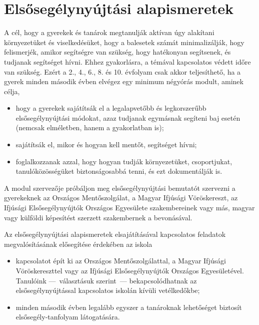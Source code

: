 \hypertarget{elsosegely-nyujtasi-alapismeretek}{%
\section{Elsősegélynyújtási
alapismeretek}\label{elsosegely-nyujtasi-alapismeretek}}

A cél, hogy a gyerekek és tanárok megtanulják aktívan úgy alakítani
környezetüket és viselkedésüket, hogy a balesetek számát minimalizálják,\break
hogy felismerjék, amikor segítségre van szükség, hogy hatékonyan
segítsenek, és tudjanak segítséget hívni. Ehhez gyakorlásra, a témával
kapcsolatos védett időre van szükség. Ezért a 2., 4., 6., 8. és
10. évfolyam csak akkor teljesíthető, ha a gyerek minden második évben
elvégez egy minimum négyórás modult, aminek célja,

\begin{itemize}
\tightlist
\item
  hogy a gyerekek sajátítsák el a legalapvetőbb és legkorszerűbb
  elsősegélynyújtási módokat, azaz tudjanak egymásnak segíteni
  baj esetén (nemcsak elméletben, hanem a gyakorlatban is);
\item
  sajátítsák el, mikor és hogyan kell mentőt, segítséget hívni;
\item
  foglalkozzanak azzal, hogy hogyan tudják környezetüket, csoportjukat,
  tanulóközösségüket biztonságosabbá tenni, és ezt dokumentálják is.
\end{itemize}

A modul szervezője próbáljon meg elsősegélynyújtási bemutatót szervezni
a gyerekeknek az Országos Mentőszolgálat, a Magyar Ifjúsági Vöröskereszt,
az Ifjúsági Elsősegélynyújtók Országos Egyesülete szakembereinek vagy más,
magyar vagy külföldi képesítést szerzett szakembernek a bevonásával.

Az elsősegélynyújtási alapismeretek elsajátításával kapcsolatos
feladatok megvalósításának elősegítése érdekében az iskola

\begin{itemize}
\tightlist
\item
  kapcsolatot épít ki az Országos Mentőszolgálattal, a Magyar Ifjúsági
  Vöröskereszttel vagy az Ifjúsági Elsősegélynyújtók Országos
  Egyesületével. Tanulóink ---~választásuk szerint~--- bekapcsolódhatnak
  az elsősegélynyújtással kapcsolatos iskolán kívüli vetélkedőkbe;
\item
  minden második évben legalább egyszer a tanároknak lehetőséget
  biztosít elsősegély-tanfolyam látogatására.
\end{itemize}

